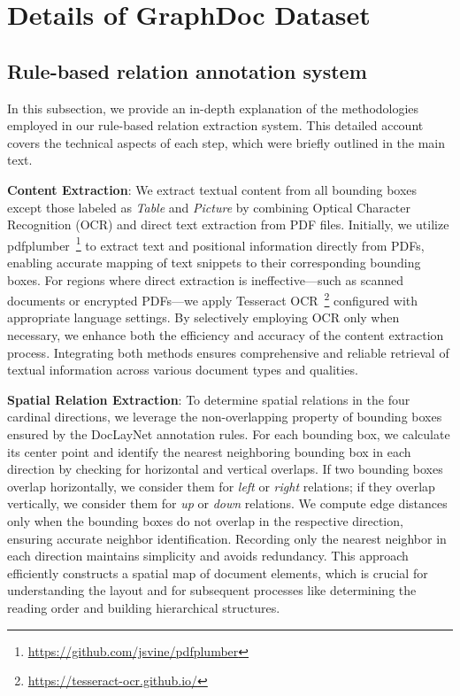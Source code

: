 \section{Details of GraphDoc Dataset}
\subsection{Rule-based relation annotation system}
\label{detailed pipeline}
In this subsection, we provide an in-depth explanation of the methodologies employed in our rule-based relation extraction system. This detailed account covers the technical aspects of each step, which were briefly outlined in the main text.

\noindent \textbf{Content Extraction}: We extract textual content from all bounding boxes except those labeled as \textit{Table} and \textit{Picture} by combining Optical Character Recognition (OCR) and direct text extraction from PDF files. Initially, we utilize pdfplumber~\footnote{\url{https://github.com/jsvine/pdfplumber}} to extract text and positional information directly from PDFs, enabling accurate mapping of text snippets to their corresponding bounding boxes. For regions where direct extraction is ineffective—such as scanned documents or encrypted PDFs—we apply Tesseract OCR~\footnote{\url{https://tesseract-ocr.github.io/}} configured with appropriate language settings. By selectively employing OCR only when necessary, we enhance both the efficiency and accuracy of the content extraction process. Integrating both methods ensures comprehensive and reliable retrieval of textual information across various document types and qualities.

\noindent \textbf{Spatial Relation Extraction}: To determine spatial relations in the four cardinal directions, we leverage the non-overlapping property of bounding boxes ensured by the DocLayNet annotation rules. For each bounding box, we calculate its center point and identify the nearest neighboring bounding box in each direction by checking for horizontal and vertical overlaps. If two bounding boxes overlap horizontally, we consider them for \textit{left} or \textit{right} relations; if they overlap vertically, we consider them for \textit{up} or \textit{down} relations. We compute edge distances only when the bounding boxes do not overlap in the respective direction, ensuring accurate neighbor identification. Recording only the nearest neighbor in each direction maintains simplicity and avoids redundancy. This approach efficiently constructs a spatial map of document elements, which is crucial for understanding the layout and for subsequent processes like determining the reading order and building hierarchical structures.

